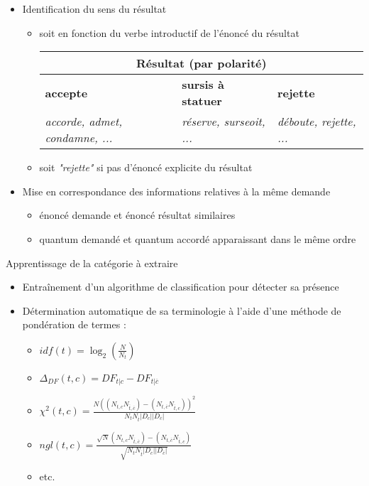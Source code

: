 \begin{frame}[t]{\mysubsectiontitle}
\begin{itemize}
	    \item Identification du sens du résultat 
	    \begin{itemize} \scriptsize
	    	\item soit en fonction du verbe introductif de l'énoncé du résultat	 
	    	\begin{tabular}{|p{}|p{}|p{}|}
	    		\hline
 \multicolumn{3}{|c|}{\textbf{Résultat} (par polarité)} \\ \hline
	    		\textbf{accepte}  &\textbf{sursis à statuer} & \textbf{rejette}  \\ \hline
 \textit{accorde, admet, condamne, ...} & \textit{réserve, surseoit, ...} & \textit{déboute, rejette, ...} \\ \hline
	    	\end{tabular}   	
	    	\item soit \textit{"rejette"} si pas d'énoncé explicite du résultat
	    \end{itemize}
		\item Mise en correspondance des informations relatives à la même demande
		\begin{itemize} \scriptsize
			\item énoncé demande et énoncé résultat similaires
			\item quantum demandé et quantum accordé apparaissant dans le même ordre
		\end{itemize}
	\end{itemize}
\end{frame}

\begin{frame}[t]{\mysubsectiontitle}
	Apprentissage de la catégorie à extraire
	\begin{itemize} \scriptsize
		\item Entraînement d'un algorithme de classification pour détecter sa présence 
		\item Détermination automatique de sa terminologie à l'aide d'une méthode de pondération de termes : 
		\begin{itemize} \scriptsize
			\item $idf(t) = \log_2\left(\frac{N}{N_t}\right)$ \cite{sparck1972idf}
			\item $\Delta_{DF}(t,c) = DF_{t \vert c} - DF_{t \vert \overline{c}}$
			\item $\chi^2(t,c) = \frac{N ((N_{t,c} N_{\overline{t},\overline{c}}) - (N_{t,\overline{c}} N_{\overline{t},c}))^2}{N_t N_{\overline{t}} \vert D_c \vert \vert D_{\overline{c}} \vert }$ \cite{schutze1995chi2}
			\item $ngl(t,c) = \frac{\sqrt{N} (N_{t,c} N_{\overline{t},\overline{c}}) - (N_{t,\overline{c}} N_{\overline{t},c})}{\sqrt{N_t N_{\overline{t}} \vert D_c \vert \vert D_{\overline{c}} \vert }}$ \cite{ng1997ngl}
			\item etc.
		\end{itemize}
	\end{itemize}
\end{frame}
